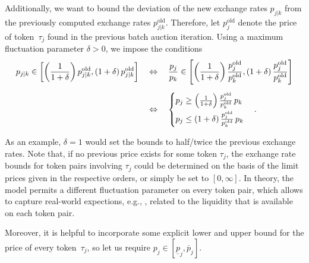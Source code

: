 \documentclass[11pt,parskip=full]{scrartcl}%
\newcommand*{\eg}{e.g., }
\begin{document}
Additionally, we want to bound the deviation of the new exchange rates $ p_{j|k} $ from the
previously computed exchange rates $ p_{j|k}^\mathrm{old} $.
Therefore, let $ p^\mathrm{old}_j $ denote the price of token~$ \tau_j $ found in the previous
batch auction iteration.
Using a maximum fluctuation parameter $ \delta > 0 $, we impose the conditions
\begin{align}
  p_{j|k} \in
  \left[
    \left(\frac{1}{1+\delta}\right) p^\mathrm{old}_{j|k},
    (1+\delta) \, p^\mathrm{old}_{j|k}
  \right]
  \quad &\Leftrightarrow \quad
  \frac{p_j}{p_k} \in
  \left[
    \left(\frac{1}{1+\delta}\right) \frac{p^\mathrm{old}_j}{p^\mathrm{old}_k},
    (1+\delta) \, \frac{p^\mathrm{old}_j}{p^\mathrm{old}_k}
  \right]\notag\\[2mm]
  \quad &\Leftrightarrow \quad
  \begin{cases}
    p_j \ge \left(\frac{1}{1+\delta}\right) \frac{p^\mathrm{old}_j}{p^\mathrm{old}_k} \, p_k
    \\[2mm]
    p_j \le \left(1+\delta\right) \frac{p^\mathrm{old}_j}{p^\mathrm{old}_k} \, p_k
  \end{cases}.
  \label{eq:bounds_xrates}
\end{align}

As an example, $ \delta = 1 $ would set the bounds to half/twice the previous exchange rates.
Note that, if no previous price exists for some token $ \tau_j $, the exchange rate bounds for
token pairs involving $ \tau_j $ could be determined on the basis of the limit prices given in
the respective orders, or simply be set to $ [0,\infty] $.
In theory, the model permits a different fluctuation parameter on every token pair, which allows to
capture real-world expections, \eg, related to the liquidity that is available on each token pair. 

Moreover, it is helpful to incorporate some explicit lower and upper bound for the price of every
token~$ \tau_j $, so let us require $ p_j \in [\underline{p}_j,\overline{p}_j] $.
\end{document}
